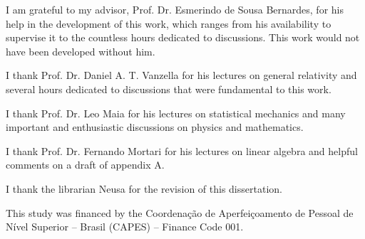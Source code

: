 \documentclass[
12pt,		%
openright,	%
twoside,  %
a4paper,			%
chapter=TITLE,		%
english,			%
french,				%
spanish,			%
brazil				%
]{USPSC-classe/USPSC}
\begin{document}
\imprimircapa

\imprimirfolhaderosto*





\begin{agradecimentos}

I am grateful to my advisor, Prof. Dr. Esmerindo de Sousa Bernardes, for his help in the development of this work, which ranges from his availability to supervise it to the countless hours dedicated to discussions. This work would not have been developed without him.

I thank Prof. Dr. Daniel A. T. Vanzella for his lectures on general relativity and several hours dedicated to discussions that were fundamental to this work.

I thank Prof. Dr. Leo Maia for his lectures on statistical mechanics and many important and enthusiastic discussions on physics and mathematics.

I thank Prof. Dr. Fernando Mortari for his lectures on linear algebra and helpful comments on a draft of appendix A.

I thank the librarian Neusa for the revision of this dissertation.

This study was financed by the Coordenação de Aperfeiçoamento de Pessoal de
Nível Superior – Brasil (CAPES) – Finance Code 001.
	
\end{agradecimentos}
\end{document}
